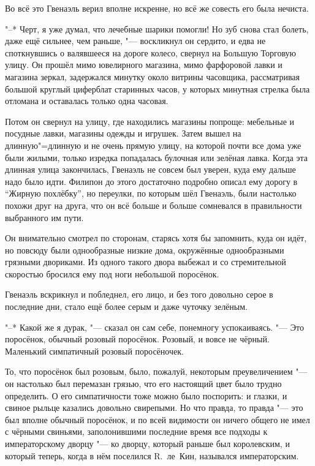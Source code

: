 Во всё это Гвенаэль верил вполне искренне, но всё же совесть его была нечиста.

"--* Черт, я уже думал, что лечебные шарики помогли!
Но зуб снова стал болеть, даже ещё сильнее, чем раньше, "--- воскликнул он
сердито, и едва не споткнувшись о валявшееся на дороге колесо, свернул на
Большую Торговую улицу.
Он прошёл мимо ювелирного магазина, мимо фарфоровой лавки и магазина зеркал,
задержался минутку около витрины часовщика, рассматривая большой круглый
циферблат старинных часов, у которых минутная стрелка была отломана и оставалась
только одна часовая.

Потом он свернул на улицу, где находились магазины попроще: мебельные и посудные
лавки, магазины одежды и игрушек.
Затем вышел на длинную"=длинную и не очень прямую улицу, на которой почти все
дома уже были жилыми, только изредка попадалась булочная или зелёная лавка.
Когда эта длинная улица закончилась, Гвенаэль не совсем был уверен, куда ему
дальше надо было идти.
Филипон до этого достаточно подробно описал ему дорогу в \enquote{Жирную
похлёбку}, но переулки, по которым шёл Гвенаэль, были настолько похожи друг на
друга, что он всё больше и больше сомневался в правильности выбранного им пути.

Он внимательно смотрел по сторонам, старясь хотя бы запомнить, куда он идёт, но
повсюду были однообразные низкие дома, окружённые однообразными грязными
двориками.
Из одного такого двора выбежал и со стремительной скоростью бросился ему под
ноги небольшой поросёнок.

Гвенаэль вскрикнул и побледнел, его лицо, и без того довольно серое в последние
дни, стало ещё более серым и даже чуточку зелёным.

"--* Какой же я дурак, "--- сказал он сам себе, понемногу успокаиваясь.
"--- Это поросёнок, обычный розовый поросёнок.
Розовый, и вовсе не чёрный.
Маленький симпатичный розовый поросёночек.

То, что поросёнок был розовым, было, пожалуй, некоторым преувеличением "--- он
настолько был перемазан грязью, что его настоящий цвет было трудно определить.
О его симпатичности тоже можно было поспорить: и глазки, и свиное рыльце
казались довольно свирепыми.
Но что правда, то правда "--- это был вполне обычный поросёнок, и по всей
видимости он ничего общего не имел с чёрными свиньями, заполонившими последние
время все подходы к императорскому дворцу "--- ко дворцу, который раньше был
королевским, и который теперь, когда в нём поселился R.~ле~Кин, назывался
императорским.

